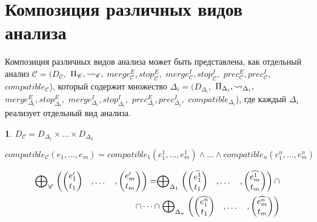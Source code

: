\section{Композиция различных видов анализа}
\label{sect_composite_analysis}

Композиция различных видов анализа может быть представлена, как отдельный анализ $\mathscr{C}=(D_{\mathscr{C}},$ $\Pi_{\mathscr{C}}, \leadsto_{\mathscr{C}},$ $merge^E_{\mathscr{C}}, stop^E_{\mathscr{C}},$ $merge^I_{\mathscr{C}}, stop^I_{\mathscr{C}},$ $prec^E_{\mathscr{C}},prec^I_{\mathscr{C}},$ $compatible_{\mathscr{C}}$), который содержит множество $\Delta_i=(D_{\Delta_i},$ $\Pi_{\Delta_i}, \leadsto_{\Delta_i},$ $merge^E_{\Delta_i}, stop^E_{\Delta_i},$ $merge^I_{\Delta_i}, stop^I_{\Delta_i},$ $prec^E_{\Delta_i},prec^I_{\Delta_i},$ $compatible_{\Delta_i}$), где каждый $\Delta_i$ реализует отдельный вид анализа.

{\textbf 1.} $D_{\mathscr{C}} = D_{\Delta_1} \times \dots \times D_{\Delta_n}$

$compatible_{\mathscr{C}}(e_1,\dots, e_m) = 
compatible_1(e_1^1,\dots, e_m^1) \land \dots \land compatible_n(e_1^n,\dots, e_m^n)$

\begin{equation}
\label{composite_epp_def}
\begin{aligned}
\mathrel{\bigoplus}_{\mathscr{C}}
\begin{pmatrix}
\begin{pmatrix}
e_1' \\
t_1 
\end{pmatrix}& ,
\dots& ,
\begin{pmatrix}
e_m' \\
t_m 
\end{pmatrix}
\end{pmatrix} = 
\mathrel{\bigoplus}_{\Delta_1}
\begin{pmatrix}
\begin{pmatrix}
\widehat{e^1_1} \\
t_1 
\end{pmatrix}& ,
\dots& ,
\begin{pmatrix}
\widehat{e^1_m} \\
t_m 
\end{pmatrix}
\end{pmatrix} \cap \\
\cap \dots \cap 
\mathrel{\bigoplus}_{\Delta_n}
\begin{pmatrix}
\begin{pmatrix}
\widehat{e^n_1} \\
t_1 
\end{pmatrix}& ,
\dots& ,
\begin{pmatrix}
\widehat{e^n_m} \\
t_m 
\end{pmatrix}
\end{pmatrix}  
\end{aligned}
\end{equation}

